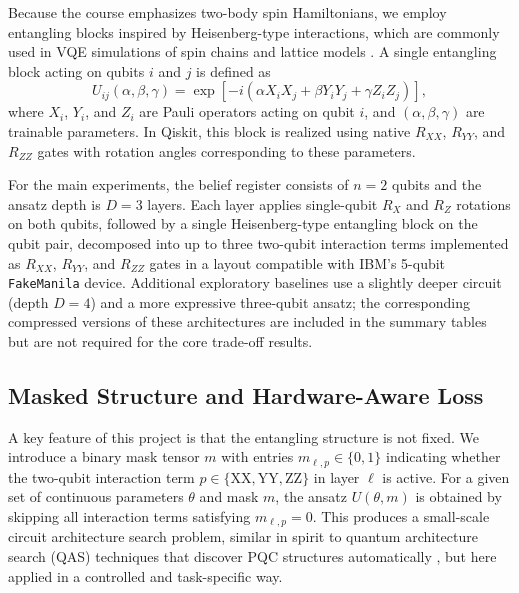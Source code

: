 \documentclass[conference]{IEEEtran}
\begin{document}
Because the course emphasizes two-body spin Hamiltonians, we employ entangling blocks inspired by Heisenberg-type interactions, which are commonly used in VQE simulations of spin chains and lattice models \cite{b14,b15,b16}. A single entangling block acting on qubits $i$ and $j$ is defined as
\begin{equation}
U_{ij}(\alpha,\beta,\gamma)
= \exp\!\left[- i\left(\alpha X_i X_j + \beta Y_i Y_j + \gamma Z_i Z_j\right)\right],
\end{equation}
where $X_i$, $Y_i$, and $Z_i$ are Pauli operators acting on qubit $i$, and $(\alpha,\beta,\gamma)$ are trainable parameters. In Qiskit, this block is realized using native $R_{XX}$, $R_{YY}$, and $R_{ZZ}$ gates with rotation angles corresponding to these parameters. 

For the main experiments, the belief register consists of $n=2$ qubits and the ansatz depth is $D=3$ layers. Each layer applies single-qubit $R_X$ and $R_Z$ rotations on both qubits, followed by a single Heisenberg-type entangling block on the qubit pair, decomposed into up to three two-qubit interaction terms implemented as $R_{XX}$, $R_{YY}$, and $R_{ZZ}$ gates in a layout compatible with IBM’s 5-qubit \texttt{FakeManila} device. Additional exploratory baselines use a slightly deeper circuit (depth $D=4$) and a more expressive three-qubit ansatz; the corresponding compressed versions of these architectures are included in the summary tables but are not required for the core trade-off results.

\subsection{Masked Structure and Hardware-Aware Loss}

A key feature of this project is that the entangling structure is not fixed. We introduce a binary mask tensor $m$ with entries $m_{\ell,p} \in \{0,1\}$ indicating whether the two-qubit interaction term $p \in \{\mathrm{XX},\mathrm{YY},\mathrm{ZZ}\}$ in layer $\ell$ is active. For a given set of continuous parameters $\theta$ and mask $m$, the ansatz $U(\theta,m)$ is obtained by skipping all interaction terms satisfying $m_{\ell,p} = 0$. This produces a small-scale circuit architecture search problem, similar in spirit to quantum architecture search (QAS) techniques that discover PQC structures automatically \cite{b16,b17}, but here applied in a controlled and task-specific way.
\end{document}
